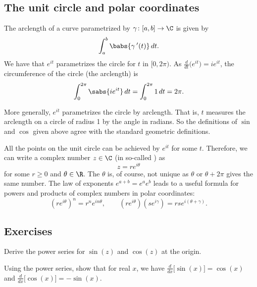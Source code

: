 \subsection{The unit circle and polar coordinates}

The arclength of a curve parametrized by $\gamma \colon [a,b] \to \C$ is given
by
\begin{equation*}
\int_a^b \babs{\gamma^{\:\prime}(t)} \, dt .
\end{equation*}
We have that $e^{it}$ parametrizes the circle for $t$ in $[0,2\pi)$.
As $\frac{d}{dt} \bigl( e^{it} \bigr) = ie^{it}$, the circumference of the
circle (the arclength) is
\begin{equation*}
\int_0^{2\pi} \sabs{i e^{it}}  \,  dt
=
\int_0^{2\pi} 1  \,  dt  = 2\pi .
\end{equation*}

More generally, $e^{it}$ parametrizes the circle by arclength.
That is, $t$ measures the arclength on a circle of radius 1 by
the angle in radians.  So the definitions of $\sin$ and $\cos$ given
above agree with the standard geometric definitions.

All the points on the unit circle can be achieved by
$e^{it}$ for some $t$.
Therefore,
we can write
a complex number $z \in \C$
(in so-called \emph{}) as
\begin{equation*}
z = r e^{i\theta}
\end{equation*}
for some $r \geq 0$ and $\theta \in \R$.  The $\theta$ is, of course,
not unique as $\theta$ or $\theta+2\pi$ gives the same number.
The law of exponents $e^{a+b} = e^a e^b$ leads to a useful formula for powers
and products of complex numbers in polar coordinates:
\begin{equation*}
{(r e^{i\theta})}^n
= r^n e^{i n \theta} ,
\qquad
(r e^{i\theta})
(s e^{i\gamma})
=
rs e^{i(\theta+\gamma)} .
\end{equation*}

\subsection{Exercises}

\begin{exercise}
Derive the power series for $\sin(z)$ and $\cos(z)$ at the origin.
\end{exercise}

\begin{exercise}
Using the power series, show that for real $x$, we have
$\frac{d}{dx} \bigl[ \sin(x)\bigr] = \cos(x)$ and
$\frac{d}{dx} \bigl[ \cos(x)\bigr] = -\sin(x)$.
\end{exercise}

